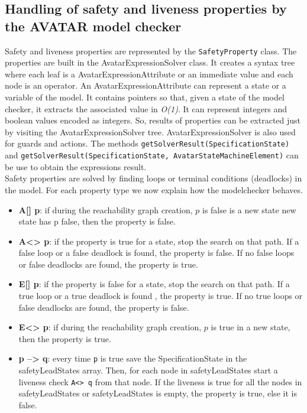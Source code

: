 \documentclass[12pt]{article}
\begin{document}
\subsection{Handling of safety and liveness properties by the AVATAR model checker}
Safety and liveness properties are represented by the \texttt{SafetyProperty} class. The properties are built in the AvatarExpressionSolver class. It creates a syntax tree where each leaf is a AvatarExpressionAttribute or an immediate value and each node is an operator. An AvatarExpressionAttribute can represent a state or a variable of the model. It contains pointers so that, given a state of the model checker, it extracts the associated value in \textit{O(1)}. It can represent integers and boolean values encoded as integers. So, results of properties can be extracted just by visiting the AvatarExpressionSolver tree. AvatarExpressionSolver is also used for guards and actions. The methods \texttt{getSolverResult(SpecificationState)} and \texttt{getSolverResult(SpecificationState, AvatarStateMachineElement)} can be use to obtain the expressions result.\\

Safety properties are solved by finding loops or terminal conditions (deadlocks) in the model. For each property type we now explain how the modelchecker behaves.
\begin{itemize}
	\item \textbf{A[] p}: if during the reachability graph creation, $p$ is false is a new state new state has p false, then the property is false.
	\item \textbf{A<> p}: if the property is true for a state, stop the search on that path. If a false loop or a false deadlock is found, the property is false. If no false loops or false deadlocks are found, the property is true.
	\item \textbf{E[] p}:  if the property is false for a state, stop the search on that path. If a true loop or a true deadlock is found , the property is true. If no true loops or false deadlocks are found, the property is false.
	\item \textbf{E<> p}:  if during the reachability graph creation, $p$ is true in a new state,  then the property is true.
	\item \textbf{p --> q}: every time \texttt{p} is true save the SpecificationState in the safetyLeadStates array. Then, for each node in safetyLeadStates start a liveness check \texttt{A<> q} from that node. If the liveness is true for all the nodes in safetyLeadStates or safetyLeadStates is empty, the property is true, else it is false.
\end{itemize}
\end{document}
